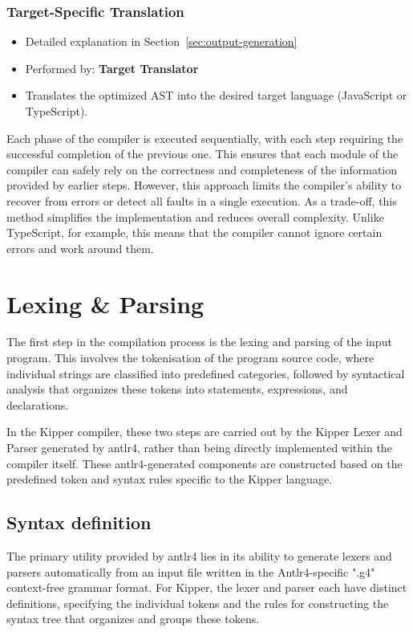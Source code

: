 \subsubsection{Target-Specific Translation}
\begin{itemize}
\item Detailed explanation in Section~\ref{sec:output-generation}
\item Performed by: \textbf{Target Translator}
\item Translates the optimized AST into the desired target language (JavaScript or TypeScript).
\end{itemize}

Each phase of the compiler is executed sequentially, with each step requiring the successful completion of the previous one. This ensures that each module of the compiler can safely rely on the correctness and completeness of the information provided by earlier steps. However, this approach limits the compiler's ability to recover from errors or detect all faults in a single execution. As a trade-off, this method simplifies the implementation and reduces overall complexity. Unlike TypeScript, for example, this means that the compiler cannot ignore certain errors and work around them. 

\section{Lexing \& Parsing}
\label{sec:lexing-parsing}

The first step in the compilation process is the lexing and parsing of the input program. This involves the tokenisation of the program source code, where individual strings are classified into predefined categories, followed by syntactical analysis that organizes these tokens into statements, expressions, and declarations.

In the Kipper compiler, these two steps are carried out by the Kipper Lexer and Parser generated by \Gls{antlr4}, rather than being directly implemented within the compiler itself. These \Gls{antlr4}-generated components are constructed based on the predefined token and syntax rules specific to the Kipper language.

\subsection{Syntax definition}

The primary utility provided by \Gls{antlr4} lies in its ability to generate lexers and parsers automatically from an input file written in the Antlr4-specific ".g4" context-free grammar format. For Kipper, the lexer and parser each have distinct definitions, specifying the individual tokens and the rules for constructing the syntax tree that organizes and groups these tokens.

